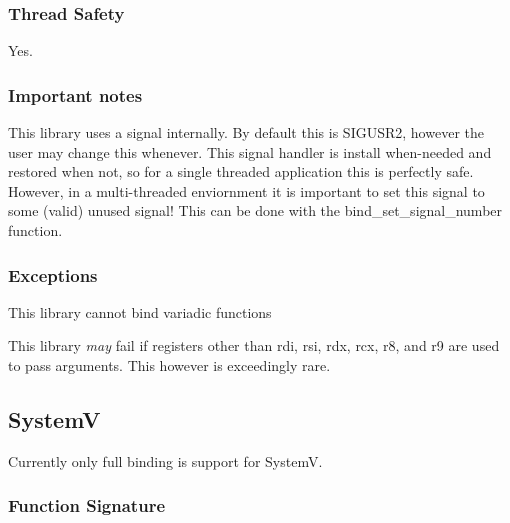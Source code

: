\subsubsection*{Thread Safety}

Yes.

\subsubsection*{Important notes}


\begin{DoxyEnumerate}
\item This library uses a signal internally. By default this is {\ttfamily S\+I\+G\+U\+S\+R2}, however the user may change this whenever. This signal handler is install when-\/needed and restored when not, so for a single threaded application this is perfectly safe. However, in a multi-\/threaded enviornment it is important to set this signal to some (valid) unused signal! This can be done with the {\ttfamily bind\+\_\+set\+\_\+signal\+\_\+number} function.
\end{DoxyEnumerate}

\subsubsection*{Exceptions}


\begin{DoxyEnumerate}
\item This library cannot bind variadic functions
\end{DoxyEnumerate}
\begin{DoxyEnumerate}
\item This library {\itshape may} fail if registers other than {\ttfamily rdi}, {\ttfamily rsi,} {\ttfamily rdx}, {\ttfamily rcx}, {\ttfamily r8}, and {\ttfamily r9} are used to pass arguments. This however is exceedingly rare.
\end{DoxyEnumerate}

\subsection*{SystemV}

Currently only full binding is support for SystemV.

\subsubsection*{Function Signature}

